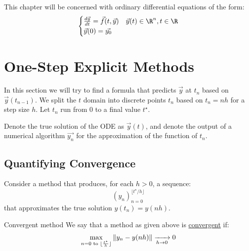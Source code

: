\documentclass[../Main.tex]{subfiles}
\begin{document}
This chapter will be concerned with ordinary differential equations of the form:
\begin{equation}
    \begin{cases}
        \frac{d\vec{y}}{dt} = \vec{f}(t, \vec{y})  & \vec{y}(t) \in \R^n, t \in \R \\
        \vec{y}(0) = \vec{y_0} & 
    \end{cases}
    \label{eqnGeneralODE}
\end{equation}
\section{One-Step Explicit Methods}
In this section we will try to find a formula that predicts $\vec{y}$ at $t_n$ based on $\vec{y}(t_{n-1})$. We split the $t$ domain into discrete points $t_n$ based on $t_n = nh$ for a step size $h$. Let $t_n$ run from $0$ to a final value $t^\star$.

Denote the true solution of the ODE as $\vec{y}(t)$, and denote the output of a numerical algorithm $\vec{y_n}$ for the approximation of the function of $t_n$.
\subsection{Quantifying Convergence}
Consider a method that produces, for each $h > 0$, a sequence:
\begin{equation*}
    (y_n)_{n = 0}^{\lfloor t^\star  / h \rfloor}
\end{equation*}
that approximates the true solution $y(t_n) = y(nh)$.
\begin{definition}{Convergent method}
    We say that a method as given above is \underline{convergent} if:
    \begin{equation*}
        \max_{n = 0 \text{ to } \lfloor \frac{t^\star}{h}\rfloor} \left\|y_n - y(nh)\right\| \xrightarrow[h \to 0]{} 0
    \end{equation*}
\end{definition}
\end{document}
